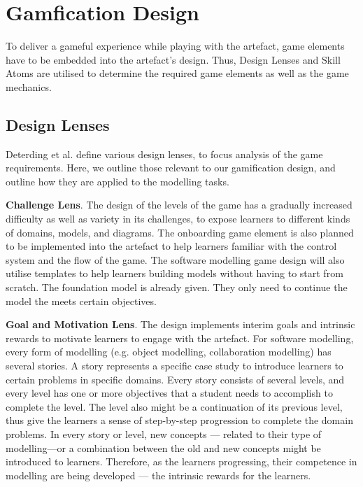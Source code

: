 \documentclass[runningheads,a4paper]{llncs}
\begin{document}
\section{Gamfication Design}
To deliver a gameful experience while playing with the artefact, game elements have to be embedded into the artefact's design. Thus, Design Lenses and Skill Atoms \cite{deterding2015lens} are utilised to determine the required game elements as well as the game mechanics. 

\subsection{Design Lenses}
Deterding et al. \cite{deterding2015lens} define various design lenses, to focus analysis of the game requirements. Here, we outline those relevant to our gamification design, and outline how they are applied to the modelling tasks.

\textbf{Challenge Lens}. The design of the levels of the game has a gradually increased difficulty as well as variety in its challenges, to expose learners to different kinds of domains, models, and diagrams. The onboarding game element is also planned to be implemented into the artefact to help learners familiar with the control system and the flow of the game. The software modelling game design will also utilise templates to help learners building models without having to start from scratch. The foundation model is already given. They only need to continue the model the meets certain objectives.

\textbf{Goal and Motivation Lens}. The design implements interim goals and intrinsic rewards to motivate learners to engage with the artefact. For software modelling, every form of modelling (e.g. object modelling, collaboration modelling) has several stories. A story represents a specific case study to introduce learners to certain problems in specific domains. Every story consists of several levels, and every level has one or more objectives that a student needs to accomplish to complete the level. The level also might be a continuation of its previous level, thus give the learners a sense of step-by-step progression to complete the domain problems. In every story or level, new concepts --- related to their type of modelling---or a combination between the old and new concepts might be introduced to learners. Therefore, as the learners progressing, their competence in modelling are being developed --- the intrinsic rewards for the learners. 
\end{document}
